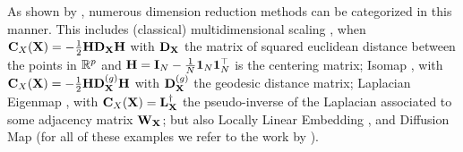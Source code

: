 As shown by \citet{ham2004kernel, ghojogh2021unified}, numerous dimension reduction methods can be categorized in this manner.
This includes 
(classical) multidimensional scaling \citep{borg2005modern}, when ${\mathbf{C}}_{X}({\mathbf{X}}) = -\frac{1}{2} {\mathbf{H}} {\mathbf{D}}_{\mathbf{X}} {\mathbf{H}}$ with ${\mathbf{D}}_{\mathbf{X}}$ the matrix of squared euclidean distance between the points in $\mathbb{R}^{p}$ and ${\mathbf{H}} = {\mathbf{I}}_N - \frac{1}{N} \bm{1}_N \bm{1}_N^\top$ is the centering matrix; Isomap \citep{tenenbaum2000global}, with ${\mathbf{C}}_{X}({\mathbf{X}}) = -\frac{1}{2} {\mathbf{H}} {\mathbf{D}}_{\mathbf{X}}^{(g)} {\mathbf{H}}$ with ${\mathbf{D}}_{\mathbf{X}}^{(g)}$ the geodesic distance matrix; Laplacian Eigenmap
\citep{belkin2003laplacian}, with ${\mathbf{C}}_{X}({\mathbf{X}}) = {\mathbf{L}}_{\mathbf{X}}^{\dagger}$ the pseudo-inverse of the Laplacian associated to some adjacency matrix ${\mathbf{W}}_{\mathbf{X}}$; but also Locally Linear Embedding \citep{roweis2000nonlinear}, and Diffusion Map \citep{coifman2006diffusion} (for all of these examples we refer to the work by \citealt[Table 1]{ghojogh2021unified}).

